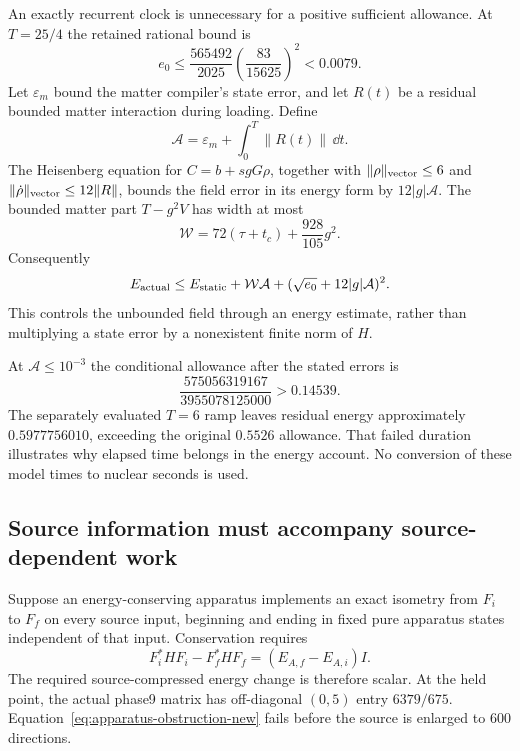 An exactly recurrent clock is unnecessary for a positive sufficient
allowance. At $T=25/4$ the retained rational bound is
\begin{equation}
e_0\leq\frac{565492}{2025}\left(\frac{83}{15625}\right)^2<0.0079.
\end{equation}
Let $\varepsilon_m$ bound the matter compiler's state error, and let
$R(t)$ be a residual bounded matter interaction during loading. Define
\begin{equation}
\mathcal A=\varepsilon_m+\int_0^T\|R(t)\|\,\dd t.
\end{equation}
The Heisenberg equation for $C=b+sgG\rho$, together with
$\|\rho\|_{\rm vector}\leq6$ and
$\|\dot\rho\|_{\rm vector}\leq12\|R\|$, bounds the field error in its
energy form by $12|g|\mathcal A$. The bounded matter part $T-g^2V$ has
width at most
\begin{equation}
\mathcal W=72(\tau+t_c)+\frac{928}{105}g^2.
\end{equation}
Consequently
\begin{equation}
E_{\rm actual}\leq E_{\rm static}+\mathcal W\mathcal A
+(\sqrt{e_0}+12|g|\mathcal A)^2.
\label{eq:energy-error-new}
\end{equation}
This controls the unbounded field through an energy estimate, rather than
multiplying a state error by a nonexistent finite norm of $H$.

At $\mathcal A\leq10^{-3}$ the conditional allowance after the stated
errors is
\begin{equation}
\frac{575056319167}{3955078125000}>0.14539.
\end{equation}
The separately evaluated $T=6$ ramp leaves residual energy approximately
$0.5977756010$, exceeding the original $0.5526$ allowance. That failed
duration illustrates why elapsed time belongs in the energy account.
No conversion of these model times to nuclear seconds is used.

\subsection{Source information must accompany source-dependent work}
\label{sec:apparatus-obstruction-new}

Suppose an energy-conserving apparatus implements an exact isometry from
$F_i$ to $F_f$ on every source input, beginning and ending in fixed pure
apparatus states independent of that input. Conservation requires
\begin{equation}
F_i^*HF_i-F_f^*HF_f=(E_{A,f}-E_{A,i})I.
\label{eq:apparatus-obstruction-new}
\end{equation}
The required source-compressed energy change is therefore scalar. At the
held point, the actual phase9 matrix has off-diagonal $(0,5)$ entry
$6379/675$. Equation~\eqref{eq:apparatus-obstruction-new} fails before
the source is enlarged to 600 directions.

